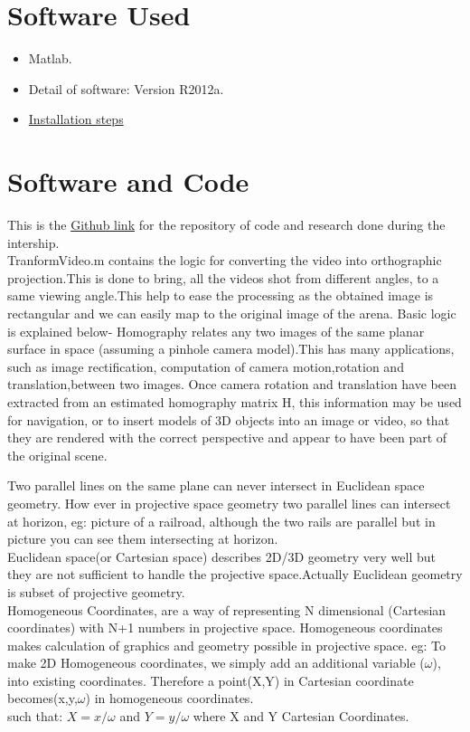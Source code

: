\documentclass[a4paper,12pt,oneside]{book}
\begin{document}
\section{Software Used}
\begin{itemize}
  \item Matlab.
  \item Detail of software: Version R2012a. 
  \item \href{https://www.youtube.com/watch?v=krEPOXPvNIg}{Installation steps}
\end{itemize}

\section{Software and Code}
This is the \href{https://github.com/eYSIP-2016/Automatic-Theme-evaluation-from-videos}{Github link} for the repository of code and research done during the intership.\\
TranformVideo.m contains the logic for converting the video into orthographic projection.This is done to bring, all the videos shot from different angles, to a same viewing angle.This help to ease the processing as the obtained image is rectangular and we can easily map to the original image of the arena. Basic logic is explained below-
Homography relates any two images of the same planar surface in space (assuming a pinhole camera model).This has many applications, such as image rectification, computation of camera motion,rotation and translation,between two images. Once camera rotation and translation have been extracted from an estimated homography matrix H, this information may be used for navigation, or to insert models of 3D objects into an image or video, so that they are rendered with the correct perspective and appear to have been part of the original scene. 

Two parallel lines on the same plane can never intersect in Euclidean space geometry. How ever in projective space geometry two parallel lines can intersect at horizon, eg: picture of a railroad, although the two rails are parallel but in picture you can see them intersecting at horizon.\\
Euclidean space(or Cartesian space) describes 2D/3D geometry very well but they are not sufficient to handle the projective space.Actually  Euclidean geometry is subset of projective geometry.\\
Homogeneous Coordinates, are a way of representing N dimensional (Cartesian coordinates) with N+1 numbers in projective space. Homogeneous coordinates makes calculation of graphics and geometry possible in projective space.
eg: To make 2D Homogeneous coordinates, we simply add an additional variable ($\omega$), into existing coordinates. Therefore a point(X,Y) in Cartesian coordinate becomes(x,y,$\omega$) in homogeneous coordinates.\\ 
such that: $X=x/\omega$ and $Y=y/\omega$ where X and Y Cartesian Coordinates.
\end{document}
